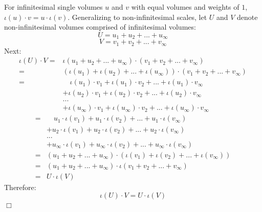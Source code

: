 For infinitesimal single volumes \(u\) and \(v\) with equal volumes and weights of \(1\), \(\iota(u) \cdot v = u \cdot \iota(v)\). Generalizing to non-infinitesimal scales, let \(U\) and \(V\) denote non-infinitesimal volumes comprised of infinitesimal volumes:
\[U = u_1 + u_2 + ... + u_{\infty}\] 
\[V = v_1 + v_2 + ... + v_{\infty}\]
Next:
\begin{align*}
\iota(U) \cdot V
= & \iota(u_1 + u_2 + ... + u_{\infty}) \cdot (v_1 + v_2 + ... + v_{\infty}) \\
= & (\iota(u_1) + \iota(u_2) + ... + \iota(u_{\infty})) \cdot (v_1 + v_2 + ... + v_{\infty}) \\  
= & \quad \iota(u_1) \cdot v_1 + \iota(u_1) \cdot v_2 + ... + \iota(u_1) \cdot v_\infty \\  
& + \iota(u_2) \cdot v_1 + \iota(u_2) \cdot v_2 + ... + \iota(u_2) \cdot v_\infty \\  
& ... \\
& + \iota(u_\infty) \cdot v_1 + \iota(u_\infty) \cdot v_2 + ... + \iota(u_\infty) \cdot v_\infty   
\end{align*}
\begin{align*}
= & \quad u_1 \cdot \iota(v_1) + u_1 \cdot \iota(v_2) + ... + u_1 \cdot \iota(v_\infty) \\ 
& + u_2 \cdot \iota(v_1) + u_2 \cdot \iota(v_2) + ... + u_2 \cdot \iota(v_\infty) \\ 
& ... \\ 
& + u_\infty \cdot \iota(v_1) + u_\infty \cdot \iota(v_2) + ... + u_\infty \cdot \iota(v_\infty) \\ 
= & (u_1 + u_2 + ... + u_\infty) \cdot (\iota(v_1) + \iota(v_2) + ... + \iota(v_\infty)) \\ 
= & (u_1 + u_2 + ... + u_\infty) \cdot \iota(v_1 + v_2 + ... + v_\infty) \\ 
= & U \cdot \iota(V)
\end{align*}
Therefore:
\[\iota(U) \cdot V = U \cdot \iota(V)\]
\(\Box\)



